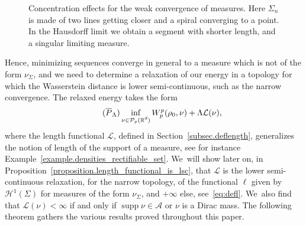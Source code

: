 \documentclass[11pt]{article}
\numberwithin{equation}{section}
\let\ts\textstyle
\theoremstyle{definition}
\newcommand\LM[1]{\hbox{\vrule width.5pt \vbox to#1pt{\vfill \hrule width#1pt height.5pt}}}
\newcommand\LL{{\mathchoice {\>\LM7\>}{\>\LM7\>}{\,\LM5\,}{\,\LM{3.35}\,}}}
\newcommand{\mres}{\LL}
\newcommand\cH{\mathcal{H}}
\newcommand{\RR}{\mathbb{R}}
\DeclareMathOperator{\supp}{supp}
\newcommand{\distH}{d_{\mathcal{H}}}
\begin{document}
\begin{figure}[t]
{
}
\caption{Concentration effects for the weak convergence of measures. Here $\Sigma_n$ is made of two lines getting closer and a spiral converging to a point. In the Hausdorff limit we obtain a segment with shorter length, and a singular limiting measure.}\label{figure.concentration_sets_measure}
\vspace*{-.1\baselineskip}
\end{figure}

Hence, minimizing sequences converge in general to a measure which is
not of the form $\nu_\Sigma$, and we need to determine a relaxation of our energy in a topology for which the Wasserstein distance is lower semi-continuous, such as the narrow convergence.
The relaxed energy takes the form
\begin{equation}\label{problem.shape_optimization_relaxed}
\tag{$\overline{P}_\Lambda$}
\inf_{
\substack{
\nu \in \mathcal{P}_p(\RR^d)
}
}
W_p^p(\rho_0, \nu) + \Lambda \mathcal{L}(\nu),
\end{equation}
where the length functional $\mathcal{L}$, defined in Section~\ref{subsec.deflength}, generalizes the notion of length of the support of a measure, see for instance Example~\ref{example.densities_rectifiable_set}. We~will show later on, in Proposition~\ref{proposition.length_functional_is_lsc},
that $\mathcal{L}$ is the lower semi-continuous relaxation, for the narrow topology, of the functional $\ell$ given by $\cH^1(\Sigma)$ for measures
of the form $\nu_\Sigma$, and $+\infty$ else, see~\eqref{eq:defl}. We~also find that $\mathcal{L}(\nu) < \infty$ if and only if $\supp \nu \in \mathcal{A}$ or $\nu$ is a Dirac mass. The following theorem gathers the various results proved throughout this paper.
\end{document}
